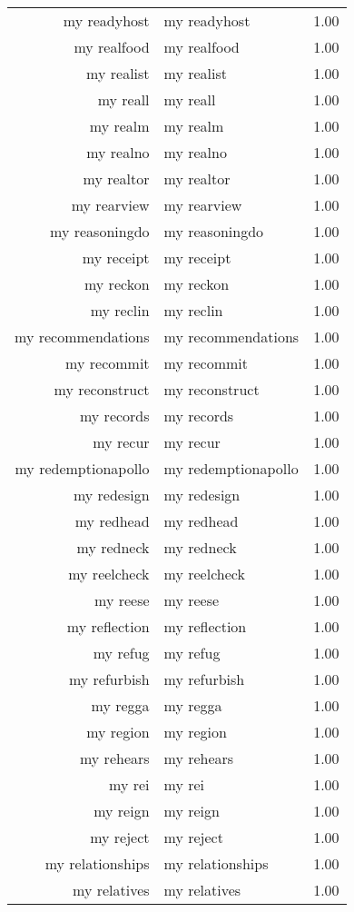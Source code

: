 \begin{table}[ht]
\begin{tabular}{rlr}
  my readyhost & my readyhost & 1.00 \\ 
  my realfood & my realfood & 1.00 \\ 
  my realist & my realist & 1.00 \\ 
  my reall & my reall & 1.00 \\ 
  my realm & my realm & 1.00 \\ 
  my realno & my realno & 1.00 \\ 
  my realtor & my realtor & 1.00 \\ 
  my rearview & my rearview & 1.00 \\ 
  my reasoningdo & my reasoningdo & 1.00 \\ 
  my receipt & my receipt & 1.00 \\ 
  my reckon & my reckon & 1.00 \\ 
  my reclin & my reclin & 1.00 \\ 
  my recommendations & my recommendations & 1.00 \\ 
  my recommit & my recommit & 1.00 \\ 
  my reconstruct & my reconstruct & 1.00 \\ 
  my records & my records & 1.00 \\ 
  my recur & my recur & 1.00 \\ 
  my redemptionapollo & my redemptionapollo & 1.00 \\ 
  my redesign & my redesign & 1.00 \\ 
  my redhead & my redhead & 1.00 \\ 
  my redneck & my redneck & 1.00 \\ 
  my reelcheck & my reelcheck & 1.00 \\ 
  my reese & my reese & 1.00 \\ 
  my reflection & my reflection & 1.00 \\ 
  my refug & my refug & 1.00 \\ 
  my refurbish & my refurbish & 1.00 \\ 
  my regga & my regga & 1.00 \\ 
  my region & my region & 1.00 \\ 
  my rehears & my rehears & 1.00 \\ 
  my rei & my rei & 1.00 \\ 
  my reign & my reign & 1.00 \\ 
  my reject & my reject & 1.00 \\ 
  my relationships & my relationships & 1.00 \\ 
  my relatives & my relatives & 1.00 \\ 

\end{tabular}
\end{table}

